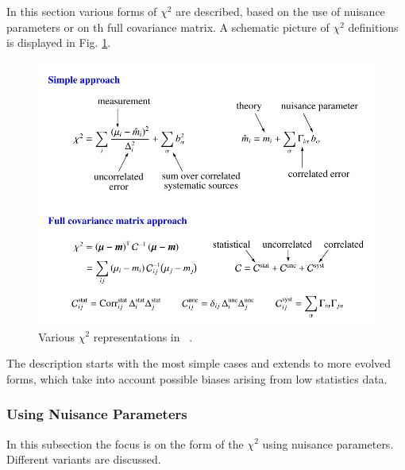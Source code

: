 \label{sec:chi2}
In this section various forms of $\chi^2$ are described, 
based on the use of nuisance parameters or on th full covariance matrix.
A schematic picture of $\chi^2$ definitions is displayed in Fig. \ref{fig:chi2}.
\begin{figure}
\begin{center}
\includegraphics[width=0.75\linewidth]{figures/chi2.pdf}
\end{center}
\caption{Various $\chi^2$ representations in \fitter\ .}
\label{fig:chi2}
\end{figure}
The description starts with the most simple cases and extends to more evolved forms, which take into account possible biases 
arising from low statistics data. 

\subsubsection{Using Nuisance Parameters}

In this subsection the focus is on the form of the $\chi^2$ using nuisance parameters. Different variants are discussed.


